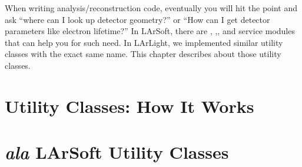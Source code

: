 When writing analysis/reconstruction code, eventually you will hit the point and ask ``where can I look up detector geometry?'' or ``How can I get detector parameters like electron lifetime?'' In LArSoft, there are \Geometry, \LArProperties,\DetectorProperties, and \GeometryUtilities service modules that can help you for such need. In LArLight, we implemented similar utility classes with the exact same name. This chapter describes about those utility classes.

\section{Utility Classes: How It Works}
\label{sec:utilbasic}


\section{{\it ala} LArSoft Utility Classes}
\label{sec:utilities}



